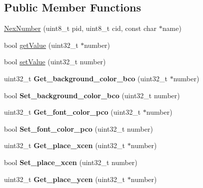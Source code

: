 \subsection*{Public Member Functions}
\begin{DoxyCompactItemize}
\item 
\hyperlink{class_nex_number_a59c2ed35b787f498e7fbc54eff71d00b}{Nex\+Number} (uint8\+\_\+t pid, uint8\+\_\+t cid, const char $\ast$name)
\item 
bool \hyperlink{class_nex_number_ad184ed818666ec482efddf840185c7b8}{get\+Value} (uint32\+\_\+t $\ast$number)
\item 
bool \hyperlink{class_nex_number_a9cef51f6b76b4ba03a31b2427ffd4526}{set\+Value} (uint32\+\_\+t number)
\item 
\hypertarget{class_nex_number_aa7ef40e79d89eb0aeebbeb67147a0d20}{uint32\+\_\+t {\bfseries Get\+\_\+background\+\_\+color\+\_\+bco} (uint32\+\_\+t $\ast$number)}\label{class_nex_number_aa7ef40e79d89eb0aeebbeb67147a0d20}

\item 
\hypertarget{class_nex_number_a8168c315e57d9aec3b61ed4febaa6663}{bool {\bfseries Set\+\_\+background\+\_\+color\+\_\+bco} (uint32\+\_\+t number)}\label{class_nex_number_a8168c315e57d9aec3b61ed4febaa6663}

\item 
\hypertarget{class_nex_number_a7eb3fba2bfa2fff8df8e7e0f633f9cf9}{uint32\+\_\+t {\bfseries Get\+\_\+font\+\_\+color\+\_\+pco} (uint32\+\_\+t $\ast$number)}\label{class_nex_number_a7eb3fba2bfa2fff8df8e7e0f633f9cf9}

\item 
\hypertarget{class_nex_number_ab1836d2d570fca4cd707acecc4b67dea}{bool {\bfseries Set\+\_\+font\+\_\+color\+\_\+pco} (uint32\+\_\+t number)}\label{class_nex_number_ab1836d2d570fca4cd707acecc4b67dea}

\item 
\hypertarget{class_nex_number_a7ca05534f06911218bae6606ccc355fa}{uint32\+\_\+t {\bfseries Get\+\_\+place\+\_\+xcen} (uint32\+\_\+t $\ast$number)}\label{class_nex_number_a7ca05534f06911218bae6606ccc355fa}

\item 
\hypertarget{class_nex_number_a5e58200c740340cc2666e61b6c80e891}{bool {\bfseries Set\+\_\+place\+\_\+xcen} (uint32\+\_\+t number)}\label{class_nex_number_a5e58200c740340cc2666e61b6c80e891}

\item 
\hypertarget{class_nex_number_ac8f0cef0d04e72bb864f6da88f028c9f}{uint32\+\_\+t {\bfseries Get\+\_\+place\+\_\+ycen} (uint32\+\_\+t $\ast$number)}\label{class_nex_number_ac8f0cef0d04e72bb864f6da88f028c9f}


\end{DoxyCompactItemize}
